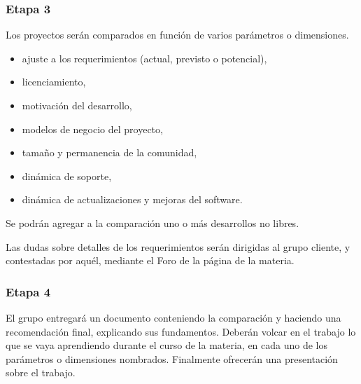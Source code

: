 \subsubsection{Etapa 3}
Los proyectos serán comparados en función de varios parámetros o dimensiones.
\begin{itemize}
	\item  ajuste a los requerimientos (actual, previsto o potencial),
	\item  licenciamiento, 
	\item  motivación del desarrollo, 
	\item  modelos de negocio del proyecto, 
	\item  tamaño y permanencia de la comunidad,
	\item  dinámica de soporte, 
	\item  dinámica de actualizaciones y mejoras del software.
\end{itemize}

Se podrán agregar a la comparación uno o más desarrollos no libres. 

Las dudas sobre detalles de los requerimientos serán dirigidas al grupo cliente, y contestadas por aquél, mediante el Foro de la página de la materia.  
\subsubsection{Etapa 4} 
El grupo entregará un documento conteniendo la comparación y haciendo una recomendación final, explicando sus fundamentos. Deberán volcar en el trabajo lo que se vaya aprendiendo durante el curso de la materia, en cada uno de los parámetros o dimensiones nombrados. Finalmente ofrecerán una presentación sobre el trabajo.

\label{sub:acreditacion}

